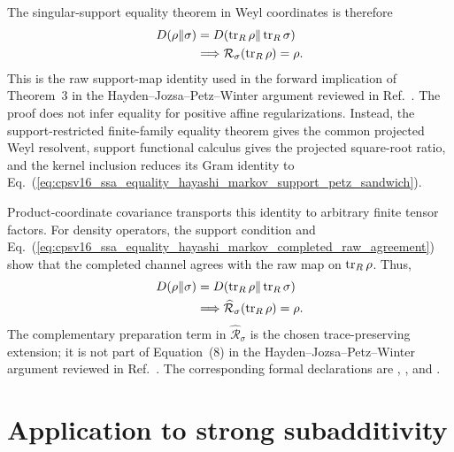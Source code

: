 \documentclass[11pt]{article}
\begin{document}
The singular-support equality theorem in Weyl coordinates is therefore
\begin{align}
    D(\rho\Vert\sigma)
        &=D(\operatorname{tr}_R\rho\Vert\operatorname{tr}_R\sigma)
    \label{eq:cpsv16_ssa_equality_hayashi_markov_partial_trace_dpi_equality}\\
    &\Longrightarrow
    \mathcal R_\sigma(\operatorname{tr}_R\rho)=\rho.
    \label{eq:cpsv16_ssa_equality_hayashi_markov_partial_trace_raw_recovery}
\end{align}
This is the raw support-map identity used in the forward implication of
Theorem~3 in the Hayden--Jozsa--Petz--Winter argument reviewed in
Ref.~\cite{Cirac2021Matrix}. The proof does not infer equality for positive
affine regularizations. Instead, the support-restricted finite-family equality
theorem gives the common projected Weyl resolvent, support functional calculus
gives the projected square-root ratio, and the kernel inclusion reduces its
Gram identity to
Eq.~(\ref{eq:cpsv16_ssa_equality_hayashi_markov_support_petz_sandwich}).

Product-coordinate covariance transports this identity to arbitrary finite
tensor factors. For density operators, the support condition and
Eq.~(\ref{eq:cpsv16_ssa_equality_hayashi_markov_completed_raw_agreement}) show
that the completed channel agrees with the raw map on $\operatorname{tr}_R\rho$. Thus,
\begin{align}
    D(\rho\Vert\sigma)
        &=D(\operatorname{tr}_R\rho\Vert\operatorname{tr}_R\sigma)
    \label{eq:cpsv16_ssa_equality_hayashi_markov_general_dpi_equality}\\
    &\Longrightarrow
    \widehat{\mathcal R}_\sigma(\operatorname{tr}_R\rho)=\rho.
    \label{eq:cpsv16_ssa_equality_hayashi_markov_completed_recovery}
\end{align}
The complementary preparation term in $\widehat{\mathcal R}_\sigma$ is the
chosen trace-preserving extension; it is not part of Equation~(8) in the
Hayden--Jozsa--Petz--Winter argument reviewed in
Ref.~\cite{Cirac2021Matrix}. The corresponding formal declarations are
,
,
and
.

\section{Application to strong subadditivity}
\end{document}
